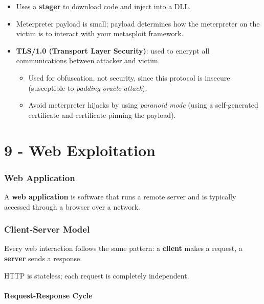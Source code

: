 \documentclass[12pt, letterpaper]{article}
\begin{document}
\begin{itemize}
    \item Uses a \textbf{stager} to download code and inject into a DLL.
    \item Meterpreter payload is small; payload determines how the meterpreter on the victim is to interact with your metasploit framework.
    \item \textbf{TLS/1.0 (Transport Layer Security)}: used to encrypt all communications between attacker and victim.
        \begin{itemize}
            \item Used for obfuscation, not security, since this protocol is insecure (susceptible to \textit{padding oracle attack}).
            \item Avoid meterpreter hijacks by using \textit{paranoid mode} (using a self-generated certificate and certificate-pinning the payload).
        \end{itemize}
\end{itemize}

\part*{9 - Web Exploitation}

\section*{Web Application}

A \textbf{web application} is software that runs a remote server and is typically accessed through a browser over a network.

\section*{Client-Server Model}

Every web interaction follows the same pattern: a \textbf{client} makes a request, a \textbf{server} sends a response.

\bigskip

HTTP is stateless; each request is completely independent.

\subsection*{Request-Response Cycle}
\end{document}
